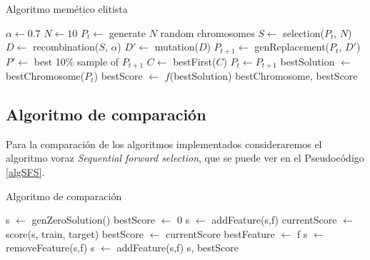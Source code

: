 \documentclass[a4paper, 11pt, titlepage]{article}
\begin{document}
    \begin{algorithm}
        \caption{Algoritmo memético elitista}\label{AM1001M}
        \begin{algorithmic}[1]
            \State $\alpha \gets 0.7$ 
            \State $N \gets 10$ 
            \State $P_t \gets$ generate $N$ random chromosomes
                \State $S \gets$ selection($P_t$, $N$) 
                \State $D \gets$ recombination($S$, $\alpha$)
                \State $D' \gets$ mutation($D$)
                \State $P_{t+1} \gets$ genReplacement($P_t$, $D'$)
                    \State $P' \gets$ best 10\% sample of $P_{t+1}$
                    \State $C \gets$ bestFirst($C$)
                    \EndFor
                \EndIf
                \State $P_t \gets P_{t+1}$
            \EndWhile
            \State bestSolution $\gets$ bestChromosome($P_t$)
            \State bestScore $\gets$ $f$(bestSolution)
            \State \Return bestChromosome, bestScore
            \EndFunction
        \end{algorithmic}
    \end{algorithm}

    \subsection{Algoritmo de comparación}

    Para la comparación de los algoritmos implementados consideraremos el algoritmo voraz \emph{Sequential forward selection}, que se puede ver en el Pseudocódigo \ref{algSFS}.

    \begin{algorithm}
        \caption{Algoritmo de comparación}\label{algSFS}
        \begin{algorithmic}[1]
            \State s $\gets$ genZeroSolution()
            \State bestScore $\gets$ 0
                    \State s $\gets$ addFeature(s,f)
                    \State currentScore $\gets$ score(s, train, target)
                    \State bestScore $\gets$ currentScore
                    \State bestFeature $\gets$ f
                    \EndIf
                    \State s $\gets$ removeFeature(s,f)
                \EndFor
            \State s $\gets$ addFeature(s,f)
            \EndIf
            \EndWhile
            \State \Return s, bestScore
            \EndFunction
        \end{algorithmic}
    \end{algorithm}
\end{document}
